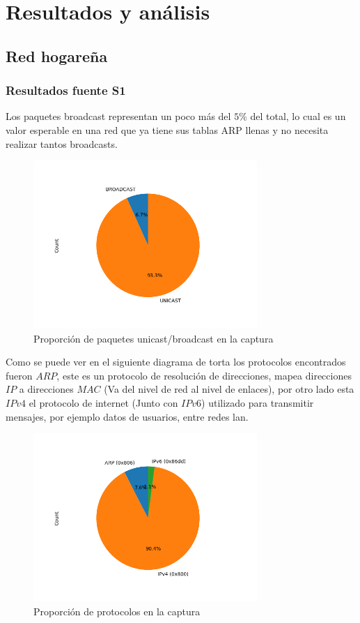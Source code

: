 \section{Resultados y análisis}

\subsection*{Red hogareña}
\subsubsection*{Resultados fuente S1}


Los paquetes broadcast representan un poco más del $5\%$ del total, lo cual es un valor esperable en una red que ya tiene sus tablas ARP llenas y no necesita realizar tantos broadcasts.

\begin{figure}[H]
 \centering
 \includegraphics[width=8.5cm]{figs/broadcast_proportion_hogar_ethernet_S1_output.png}
 \caption{\normalfont Proporción de paquetes unicast/broadcast en la captura}
\end{figure}

Como se puede ver en el siguiente diagrama de torta los protocolos encontrados fueron $ARP$, este es un protocolo de resolución de direcciones, mapea direcciones $IP$ a direcciones $MAC$ (Va del nivel de red al nivel de enlaces), por otro lado esta $IPv4$ el protocolo de internet (Junto con $IPv6$) utilizado para transmitir mensajes, por ejemplo datos de usuarios, entre redes lan.

\begin{figure}[H]
 \centering
 \includegraphics[width=8.5cm]{figs/protocols_proportion_hogar_ethernet_S1_output.png}
 \caption{\normalfont Proporción de protocolos en la captura}
\end{figure}

